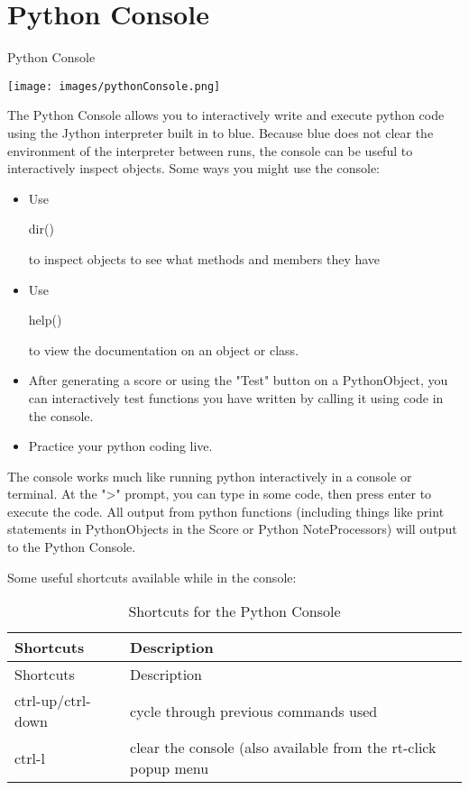 \section{Python Console}\label{pythonConsole}

Python Console

\texttt{[image: images/pythonConsole.png]}

The Python Console allows you to interactively write and execute python
code using the Jython interpreter built in to blue. Because blue does
not clear the environment of the interpreter between runs, the console
can be useful to interactively inspect objects. Some ways you might use
the console:

\begin{itemize}
\tightlist
\item
  Use

  dir()

  to inspect objects to see what methods and members they have
\item
  Use

  help()

  to view the documentation on an object or class.
\item
  After generating a score or using the "Test" button on a PythonObject,
  you can interactively test functions you have written by calling it
  using code in the console.
\item
  Practice your python coding live.
\end{itemize}

The console works much like running python interactively in a console or
terminal. At the "\textgreater{}" prompt, you can type in some code,
then press enter to execute the code. All output from python functions
(including things like print statements in PythonObjects in the Score or
Python NoteProcessors) will output to the Python Console.

Some useful shortcuts available while in the console:

\begin{longtable}[]{@{}ll@{}}
\caption{Shortcuts for the Python Console}\tabularnewline
\toprule
Shortcuts & Description\tabularnewline
\midrule
\endfirsthead
\toprule
Shortcuts & Description\tabularnewline
\midrule
\endhead
ctrl-up/ctrl-down & cycle through previous commands used\tabularnewline
ctrl-l & clear the console (also available from the rt-click popup
menu\tabularnewline
\bottomrule
\end{longtable}
